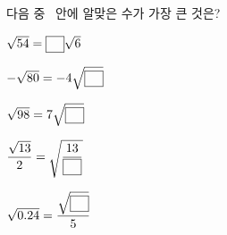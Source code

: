 다음 중 \blank\ 안에 알맞은 수가 가장 큰 것은?
\begin{choicesii}{\rule[-3ex]{0pt}{8ex}$\sqrt{54}=\blank\sqrt{6}$}{\rule[-3ex]{0pt}{8ex}$-\sqrt{80}=-4\sqrt{\blank}$}{\rule[-3ex]{0pt}{8ex}$\sqrt{98}=7\sqrt{\blank}$}{\rule[-3ex]{0pt}{8ex}$\dfrac{\sqrt{13}}{2}=\sqrt{\dfrac{13}{\blank}}$}{\rule[-3ex]{0pt}{8ex}$\sqrt{0.24}=\dfrac{\sqrt{\blank}}{5}$}\end{choicesii}
